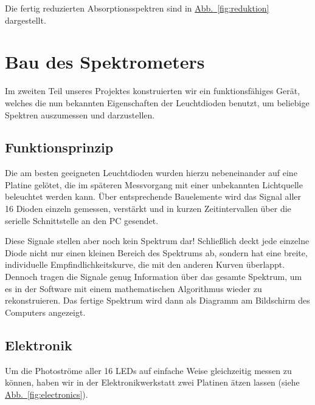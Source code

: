 \documentclass[11pt]{scrartcl}
\newcommand{\hypref}[2]{\hyperref[#2]{{#1}~\ref{#2}}}
\begin{document}
Die fertig reduzierten Absorptions\-spektren sind in \hypref{Abb.}{fig:reduktion} dargestellt.



\FloatBarrier
\section{Bau des Spektrometers}
Im zweiten Teil unseres Projektes konstruierten wir ein funktionsfähiges Gerät, welches die nun bekannten Eigenschaften der Leuchtdioden benutzt, um beliebige Spektren auszumessen und darzustellen.


\subsection{Funktionsprinzip} %
Die am besten geeigneten  Leuchtdioden wurden hierzu nebeneinander auf eine Platine gelötet, die im späteren Messvorgang mit einer unbekannten Lichtquelle beleuchtet werden kann.
Über entsprechende Bauelemente wird das Signal aller 16 Dioden einzeln gemessen, verstärkt und in kurzen Zeitintervallen über die serielle Schnittstelle an den PC gesendet.

Diese Signale stellen aber noch kein Spektrum dar! Schließlich deckt jede einzelne Diode nicht nur einen kleinen Bereich des Spektrums ab, sondern hat eine breite, individuelle Empfindlichkeitskurve, die mit den anderen Kurven überlappt.
Dennoch tragen die Signale genug Information über das gesamte Spektrum, um es in der Software mit einem mathematischen Algorithmus wieder zu rekonstruieren.
Das fertige Spektrum wird dann als Diagramm am Bildschirm des Computers angezeigt.



\subsection{Elektronik}

Um die Photoströme aller 16 LEDs auf einfache Weise gleichzeitig messen zu können, haben wir in der Elektronikwerkstatt zwei Platinen ätzen lassen (siehe \hypref{Abb.}{fig:electronics}).
\end{document}
